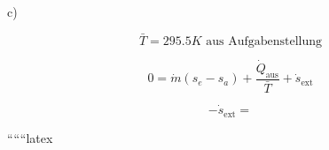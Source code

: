 c)

\[
\bar{T} = 295.5 K \text{ aus Aufgabenstellung}
\]

\[
0 = \dot{m} (s_e - s_a) + \frac{\dot{Q}_{\text{aus}}}{\bar{T}} + \dot{s}_{\text{ext}}
\]

\[
- \dot{s}_{\text{ext}} =
\]

``````latex